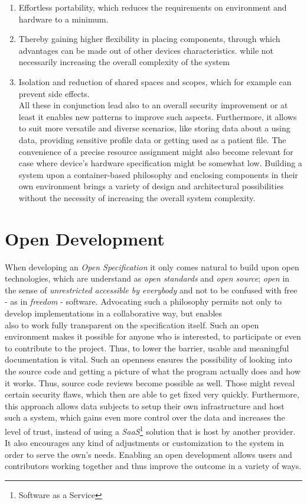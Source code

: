 \documentclass[12pt,english,a4paper,titlepage,cleardoublepage=empty,dottedtoc]{report}
\providecommand{\tightlist}{%
  \setlength{\itemsep}{0pt}\setlength{\parskip}{0pt}}
\begin{document}
\begin{enumerate}
\def\labelenumi{(\Alph{enumi})}
\tightlist
\item
  Effortless portability, which reduces the requirements on environment
  and hardware to a minimum.
\item
  Thereby gaining higher flexibility in placing components, through
  which advantages can be made out of other devices characteristics.
  while not necessarily increasing the overall complexity of the system
\item
  Isolation and reduction of shared spaces and scopes, which for example
  can prevent side effects.\\
  All these in conjunction lead also to an overall security improvement
  or at least it enables new patterns to improve such aspects.
  Furthermore, it allows to suit more versatile and diverse scenarios,
  like storing data about a using data, providing sensitive profile data
  or getting used as a patient file. The convenience of a precise
  resource assignment might also become relevant for case where device's
  hardware specification might be somewhat low. Building a system upon a
  container-based philosophy and enclosing components in their own
  environment brings a variety of design and architectural possibilities
  without the necessity of increasing the overall system complexity.
\end{enumerate}

\section{Open Development}\label{open-development}

When developing an \emph{Open Specification} it only comes natural to
build upon open technologies, which are understand as \emph{open
standards} and \emph{open source}; \emph{open} in the sense of
\emph{unrestricted accessible by everybody} and not to be confused with
free - as in \emph{freedom} - software. Advocating such a philosophy
permits not only to develop implementations in a collaborative way, but
enables\\
also to work fully transparent on the specification itself. Such an open
environment makes it possible for anyone who is interested, to
participate or even to contribute to the project. Thus, to lower the
barrier, usable and meaningful documentation is vital. Such an openness
ensures the possibility of looking into the source code and getting a
picture of what the program actually does and how it works. Thus, source
code reviews become possible as well. Those might reveal certain
security flaws, which then are able to get fixed very quickly.
Furthermore, this approach allows data subjects to setup their own
infrastructure and host such a system, which gains even more control
over the data and increases the level of trust, instead of using a
\emph{SaaS}\footnote{Software as a Service} solution that is host by
another provider. It also encourages any kind of adjustments or
customization to the system in order to serve the own's needs. Enabling
an open development allows users and contributors working together and
thus improve the outcome in a variety of ways.
\end{document}
